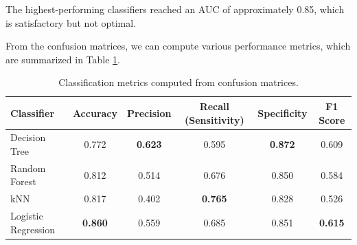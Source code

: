 \documentclass[a4paper,11pt]{article}
\begin{document}
The highest-performing classifiers reached an AUC of approximately 0.85, which is satisfactory but not optimal.

From the confusion matrices, we can compute various performance metrics, which are summarized in Table \ref{tab:classification_metrics}.

\begin{table}
    \centering
    \begin{tabular}{lccccc}
        \toprule
        \textbf{Classifier} & \textbf{Accuracy} & \textbf{Precision} & \textbf{Recall (Sensitivity)} & \textbf{Specificity} & \textbf{F1 Score} \\
        \midrule
        Decision Tree       & 0.772 & \textbf{0.623} & 0.595 & \textbf{0.872} & 0.609 \\
        Random Forest       & 0.812 & 0.514 & 0.676 & 0.850 & 0.584 \\
        kNN                 & 0.817 & 0.402 & \textbf{0.765} & 0.828 & 0.526 \\
        Logistic Regression & \textbf{0.860} & 0.559 & 0.685 & 0.851 & \textbf{0.615} \\
        \bottomrule
    \end{tabular}
    \caption{Classification metrics computed from confusion matrices.}
    \label{tab:classification_metrics}
\end{table}
\end{document}
